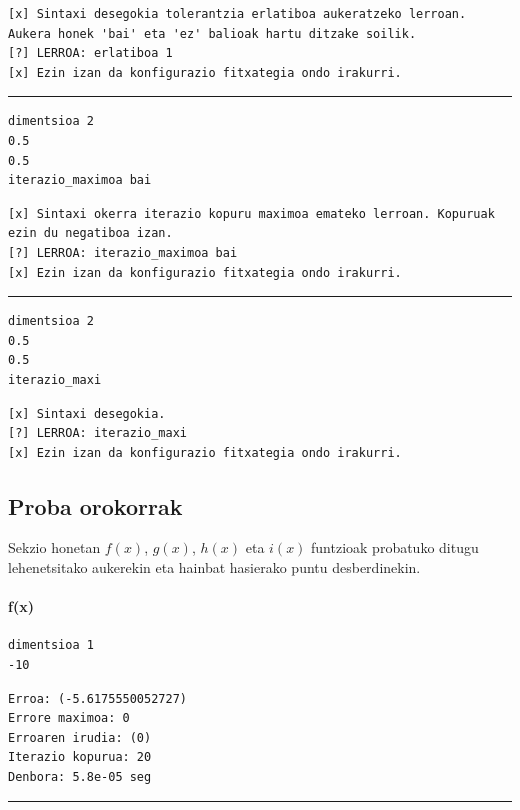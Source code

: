 \documentclass[10pt,a4paper,basque]{article}
\begin{document}
\begin{lstlisting}
[x] Sintaxi desegokia tolerantzia erlatiboa aukeratzeko lerroan. Aukera honek 'bai' eta 'ez' balioak hartu ditzake soilik.
[?] LERROA: erlatiboa 1
[x] Ezin izan da konfigurazio fitxategia ondo irakurri.
\end{lstlisting}

\rule{12cm}{0.4pt}

\begin{lstlisting}
dimentsioa 2
0.5
0.5
iterazio_maximoa bai
\end{lstlisting}

\begin{lstlisting}
[x] Sintaxi okerra iterazio kopuru maximoa emateko lerroan. Kopuruak ezin du negatiboa izan.
[?] LERROA: iterazio_maximoa bai
[x] Ezin izan da konfigurazio fitxategia ondo irakurri.
\end{lstlisting}

\rule{12cm}{0.4pt}

\begin{lstlisting}
dimentsioa 2
0.5
0.5
iterazio_maxi
\end{lstlisting}

\begin{lstlisting}
[x] Sintaxi desegokia.
[?] LERROA: iterazio_maxi
[x] Ezin izan da konfigurazio fitxategia ondo irakurri.
\end{lstlisting}

\subsection{Proba orokorrak}

Sekzio honetan $f(x)$, $g(x)$, $h(x)$ eta $i(x)$ funtzioak probatuko ditugu lehenetsitako aukerekin eta hainbat hasierako puntu desberdinekin.

\paragraph{f(x)}

\begin{lstlisting}
dimentsioa 1
-10
\end{lstlisting}

\begin{lstlisting}
Erroa: (-5.6175550052727)
Errore maximoa: 0
Erroaren irudia: (0)
Iterazio kopurua: 20
Denbora: 5.8e-05 seg
\end{lstlisting}

\rule{12cm}{0.4pt}
\end{document}
